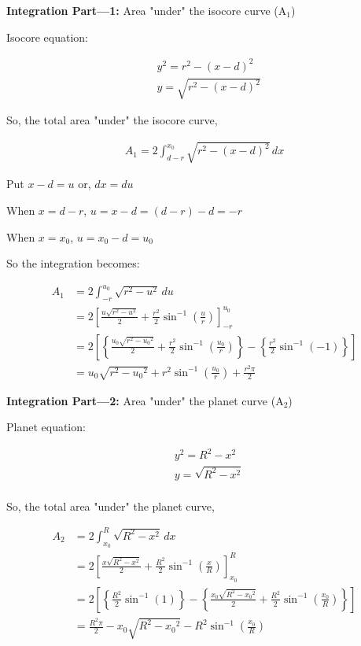 \documentclass[12pt]{extarticle}
\begin{document}
\textbf{Integration Part---1:} Area "under" the isocore curve (A$_1$)

Isocore equation:

    \begin{align*} 
       &y^2 = r^2 - (x-d)^2 \\
       &y = \sqrt{r^2 - (x-d)^2}
    \end{align*}

So, the total area "under" the isocore curve,

    \begin{align*} 
      A_1 = 2 \int_{d-r}^{x_0} \sqrt{r^2 - (x-d)^2} \,dx 
    \end{align*}

Put $x-d = u$ or, $dx = du$

When $x = d-r$, $u = x-d = (d-r)-d = -r$

When $x = x_0$, $u = x_0 - d = u_0$

So the integration becomes:

    \begin{align*} 
      A_1 &= 2 \int_{-r}^{u_0} \sqrt{r^2 - u^2} \,du \\
      &= 2\left[  \frac{u \sqrt{r^2 - u^2}}{2} + \frac{r^2}{2} \sin^{-1}{ \left(  \frac{u}{r}  \right)  }   \right]_{-r}^{u_0} \\
      &= 2\left[\left\{  \frac{u_0 \sqrt{r^2 - {u_0}^2}}{2} + \frac{r^2}{2} \sin^{-1}{\left(\frac{u_0}{r}\right)}   \right\} - \left\{ \frac{r^2}{2} \sin^{-1} (-1)  \right\}   \right] \\
      &= u_0 \sqrt{r^2 - {u_0}^2} + r^2 \sin^{-1} \left(   \frac{u_0}{r}   \right) + \frac{r^2 \pi}{2} \tag{5}
    \end{align*}


\textbf{Integration Part---2:} Area "under" the planet curve (A$_2$)


Planet equation:

    \begin{align*} 
       &y^2 = R^2 - x^2 \\
       &y = \sqrt{R^2 - x^2} \\
    \end{align*}

So, the total area "under" the planet curve,

    \begin{align*} 
      A_2 &= 2 \int_{x_0}^{R} \sqrt{R^2 - x^2} \,dx \\
      &= 2 \left[   \frac{x \sqrt{R^2 - x^2}}{2} + \frac{R^2}{2} \sin^{-1}{ \left(\frac{x}{R} \right) }  \right]_{x_0}^R \\
      &= 2 \left[  \left\{  \frac{R^2}{2} \sin^{-1}{(1)}  \right\} - \left\{ \frac{x_0 \sqrt{R^2-{x_0}^2}}{2} + \frac{R^2}{2} \sin^{-1}{\left(  \frac{x_0}{R} \right)} \right\}  \right] \\
      &= \frac{R^2 \pi}{2} - x_0 \sqrt{R^2 - {x_0}^2} - R^2 \sin^{-1}{\left( \frac{x_0}{R} \right)} \tag{6}
    \end{align*}
\end{document}
